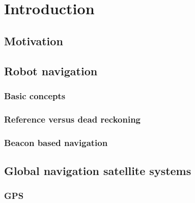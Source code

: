 \setchapterpreamble[u]{\margintoc}
\chapter[Introduction]{Introduction\footnotemark[0]}


\section{Motivation}

\section{Robot navigation}

\subsection{Basic concepts}

\subsection{Reference versus dead reckoning}

\subsection{Beacon based navigation}


\section{Global navigation satellite systems}

\subsection{GPS}

